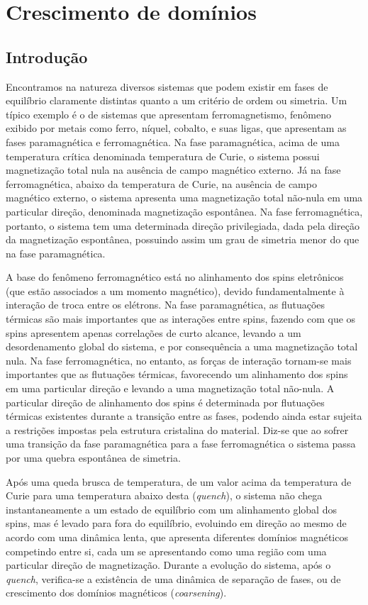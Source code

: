 \chapter{Crescimento de domínios}
 \label{cap.Crescimento}


\section{Introdução}

Encontramos na natureza diversos sistemas que podem existir em fases de equilíbrio claramente distintas quanto a um critério de ordem ou simetria. Um típico exemplo é o de sistemas que apresentam ferromagnetismo, fenômeno exibido por metais como ferro, níquel, cobalto, e suas ligas, que apresentam as fases paramagnética e ferromagnética. Na fase paramagnética, acima de uma temperatura crítica denominada temperatura de Curie, o sistema possui magnetização total nula na ausência de campo magnético externo. Já na fase ferromagnética, abaixo da temperatura de Curie, na ausência de campo magnético externo, o sistema apresenta uma magnetização total não-nula em uma particular direção, denominada magnetização espontânea. Na fase ferromagnética, portanto, o sistema tem uma determinada direção privilegiada, dada pela direção da magnetização espontânea, possuindo assim um grau de simetria menor do que na fase paramagnética.

A base do fenômeno ferromagnético está no alinhamento dos spins eletrônicos (que estão associados a um momento magnético), devido fundamentalmente à interação de troca entre os elétrons. Na fase paramagnética, as flutuações térmicas são mais importantes que as interações entre spins, fazendo com que os spins apresentem apenas correlações de curto alcance, levando a um desordenamento global do sistema, e por consequência a uma magnetização total nula. Na fase ferromagnética, no entanto, as forças de interação tornam-se mais importantes que as flutuações térmicas, favorecendo um alinhamento dos spins em uma particular direção e levando a uma magnetização total não-nula. A particular direção de alinhamento dos spins é determinada por flutuações térmicas existentes durante a transição entre as fases, podendo ainda estar sujeita a restrições impostas pela estrutura cristalina do material. Diz-se que ao sofrer uma transição da fase paramagnética para a fase ferromagnética o sistema passa por uma quebra espontânea de simetria.

Após uma queda brusca de temperatura, de um valor acima da temperatura de Curie para uma temperatura abaixo desta (\textit{quench}), o sistema não chega instantaneamente a um estado de equilíbrio com um alinhamento global dos spins, mas é levado para fora do equilíbrio, evoluindo em direção ao mesmo de acordo com uma dinâmica lenta, que apresenta diferentes domínios magnéticos competindo entre si, cada um se apresentando como uma região com uma particular direção de magnetização. Durante a evolução do sistema, após o \textit{quench}, verifica-se a existência de uma dinâmica de separação de fases, ou de crescimento dos domínios magnéticos (\textit{coarsening}).


